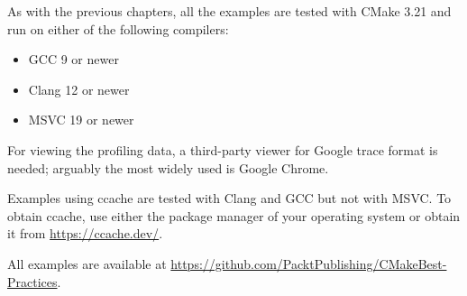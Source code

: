 As with the previous chapters, all the examples are tested with CMake 3.21 and run on either of the following compilers:

\begin{itemize}
\item 
GCC 9 or newer

\item 
Clang 12 or newer

\item 
MSVC 19 or newer
\end{itemize}

For viewing the profiling data, a third-party viewer for Google trace format is needed; arguably the most widely used is Google Chrome.

Examples using ccache are tested with Clang and GCC but not with MSVC. To obtain ccache, use either the package manager of your operating system or obtain it from \url{https://ccache.dev/}.

All examples are available at \url{https://github.com/PacktPublishing/CMakeBest-Practices}.











